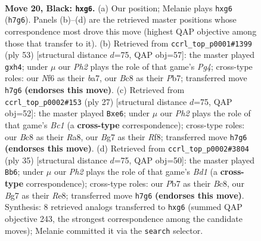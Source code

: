 \documentclass[11pt]{article}
\begin{document}
\clearpage

\begin{figure}[p]\centering
\begin{subfigure}{0.46\textwidth}\centering
\resizebox{\linewidth}{!}{%
\newchessgame
\chessboard[
  setfen={rnb1r2k/ppp1p1bp/5nP1/P1P3R1/8/1B3N2/1P3P2/RNB1K3 b Q - 2 20},
  showmover=false,
  pgfstyle=straightmove, color=movearrow, markmove={h7-g6}
]}
\caption{}
\end{subfigure}\hfill
\begin{subfigure}{0.46\textwidth}\centering
\resizebox{\linewidth}{!}{%
\newchessgame
\chessboard[
  setfen={5k2/Bprn3r/p4pb1/P2B2pp/1bN4P/1P6/1R3PP1/3R2K1 b - - 0 27},
  showmover=false,
  pgfstyle=straightmove, color=movearrow, markmove={g5-h4}
]}
\caption{}
\end{subfigure}
\\[4pt]
\begin{subfigure}{0.46\textwidth}\centering
\resizebox{\linewidth}{!}{%
\newchessgame
\chessboard[
  setfen={r1b2rk1/pp3p1p/1n2P1p1/2p5/4P3/1BP2N2/P4PPP/3RK2R b K - 0 14},
  showmover=false,
  pgfstyle=straightmove, color=movearrow, markmove={c8-e6}
]}
\caption{}
\end{subfigure}\hfill
\begin{subfigure}{0.46\textwidth}\centering
\resizebox{\linewidth}{!}{%
\newchessgame
\chessboard[
  setfen={r1bbr1k1/pp4p1/2n1pPN1/7p/7P/2P1BPP1/P7/2R1KB1R b K - 0 18},
  showmover=false,
  pgfstyle=straightmove, color=movearrow, markmove={d8-b6}
]}
\caption{}
\end{subfigure}
\caption{\textbf{Move 20, Black: \texttt{hxg6}.} (a) Our position; Melanie plays \texttt{hxg6} (\texttt{h7g6}). Panels (b)--(d) are the retrieved master positions whose correspondence most drove this move (highest QAP objective among those that transfer to it). (b) Retrieved from \texttt{ccrl\_top\_p0001\#1399} (ply 53) [structural distance $d$=75, QAP obj=57]: the master played \texttt{gxh4}; under $\mu$ our \emph{Ph2} plays the role of that game's \emph{Pg4}; cross-type roles: our \emph{N}f6 as their \emph{b}a7, our \emph{B}c8 as their \emph{P}b7; transferred move \texttt{h7g6} \textbf{(endorses this move)}. (c) Retrieved from \texttt{ccrl\_top\_p0002\#153} (ply 27) [structural distance $d$=75, QAP obj=52]: the master played \texttt{Bxe6}; under $\mu$ our \emph{Ph2} plays the role of that game's \emph{Bc1} (a \textbf{cross-type} correspondence); cross-type roles: our \emph{B}c8 as their \emph{R}a8, our \emph{B}g7 as their \emph{R}f8; transferred move \texttt{h7g6} \textbf{(endorses this move)}. (d) Retrieved from \texttt{ccrl\_top\_p0002\#3804} (ply 35) [structural distance $d$=75, QAP obj=50]: the master played \texttt{Bb6}; under $\mu$ our \emph{Ph2} plays the role of that game's \emph{Bd1} (a \textbf{cross-type} correspondence); cross-type roles: our \emph{P}b7 as their \emph{B}c8, our \emph{B}g7 as their \emph{R}e8; transferred move \texttt{h7g6} \textbf{(endorses this move)}. Synthesis: 8 retrieved analogs transferred to \texttt{hxg6} (summed QAP objective 243, the strongest correspondence among the candidate moves); Melanie committed it via the \texttt{search} selector.}
\label{fig:thought-m39}
\end{figure}
\end{document}
